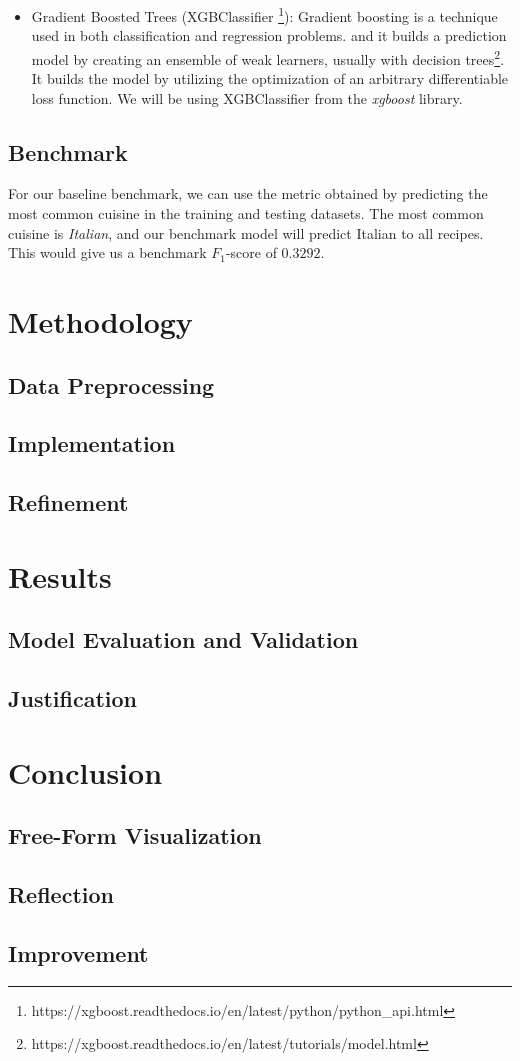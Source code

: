 \documentclass[12pt]{article}
\begin{document}
\begin{itemize}
	\item Gradient Boosted Trees (XGBClassifier \footnote{https://xgboost.readthedocs.io/en/latest/python/python\_api.html}): Gradient boosting is a technique used in both classification and regression problems. and it builds a prediction model by creating an ensemble of weak learners, usually with decision trees\footnote{https://xgboost.readthedocs.io/en/latest/tutorials/model.html}. It builds the model by utilizing the optimization of an arbitrary differentiable loss function. We will be using XGBClassifier from the \textit{xgboost} library.
\end{itemize}

\subsection{Benchmark}
For our baseline benchmark, we can use the metric obtained by predicting the most common cuisine in the training and testing datasets. The most common cuisine is \textit{Italian}, and our benchmark model will predict Italian to all recipes. This would give us a benchmark $F_1$-score of $0.3292$.

\section{Methodology}
\subsection{Data Preprocessing}

\subsection{Implementation}

\subsection{Refinement}

\section{Results}
\subsection{Model Evaluation and Validation}

\subsection{Justification}

\section{Conclusion}
\subsection{Free-Form Visualization}

\subsection{Reflection}

\subsection{Improvement}
\end{document}
